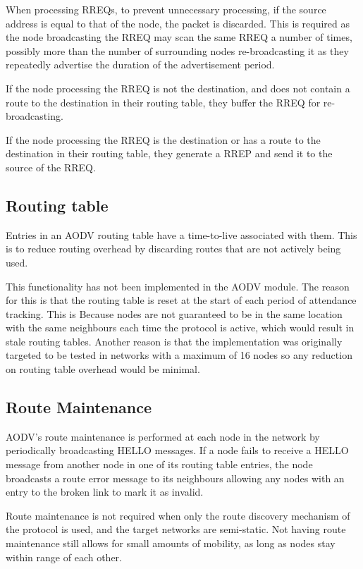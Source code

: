     When processing RREQs, to prevent unnecessary processing, if the
    source address is equal to that of the node, the packet is discarded. This is
    required as the node broadcasting the RREQ may scan the same RREQ a number
    of times, possibly more than the number of surrounding nodes re-broadcasting it
    as they repeatedly advertise the duration of the advertisement period.

    If the node processing the RREQ is not the destination, and does not contain
    a route to the destination in their routing table, they buffer the RREQ for
    re-broadcasting.

    If the node processing the RREQ is the destination or has a route to the destination
    in their routing table, they generate a RREP and send it to the source of the RREQ.

     \subsection{Routing table}
    Entries in an AODV routing table have a time-to-live associated with them. This
    is to reduce routing overhead by discarding routes that are not actively being
    used.

    This functionality has not been implemented in the AODV module. The reason for this
    is that the routing table is reset at the start of each period of attendance
    tracking. This is Because nodes are not guaranteed to be in the same location
    with the same neighbours each time the protocol is active, which would result in stale
    routing tables. Another reason is that the implementation was originally targeted
    to be tested in networks with a maximum of 16 nodes so any reduction on routing
    table overhead would be minimal.

    \subsection{Route Maintenance}
    AODV's route maintenance is performed at each node in the network by periodically
    broadcasting HELLO messages. If a node fails to receive a HELLO message from
    another node in one of its routing table entries, the node broadcasts a
    route error message to its neighbours allowing any nodes with an entry to the broken link to
    mark it as invalid.

    Route maintenance is not required when only the route discovery mechanism of
    the protocol is used, and the target networks are semi-static. Not having
    route maintenance still allows for small amounts of mobility, as long as nodes
    stay within range of each other.

